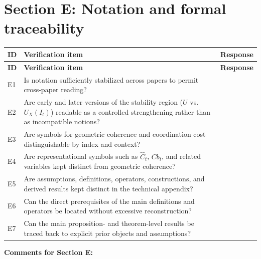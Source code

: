\documentclass[11pt,a4paper]{article}
\begin{document}
	\vspace{3em}
	
	\section{Section E: Notation and formal traceability}
	
	\begin{longtable}{>{\RaggedRight\arraybackslash}p{}
			>{\RaggedRight\arraybackslash}p{}
			>{\RaggedRight\arraybackslash}p{}}
		\toprule
		\textbf{ID} & \textbf{Verification item} & \textbf{Response} \\
		\midrule
		\endfirsthead
		\toprule
		\textbf{ID} & \textbf{Verification item} & \textbf{Response} \\
		\midrule
		\endhead
		
		E1 & Is notation sufficiently stabilized across papers to permit cross-paper reading? & \\
		
		E2 & Are early and later versions of the stability region ($U$ vs.\ $U_X(I_t)$) readable as a controlled strengthening rather than as incompatible notions? & \\
		
		E3 & Are symbols for geometric coherence and coordination cost distinguishable by index and context? & \\
		
		E4 & Are representational symbols such as $\widehat{C}_t$, $Cb_t$, and related variables kept distinct from geometric coherence? & \\
		
		E5 & Are assumptions, definitions, operators, constructions, and derived results kept distinct in the technical appendix? & \\
		
		E6 & Can the direct prerequisites of the main definitions and operators be located without excessive reconstruction? & \\
		
		E7 & Can the main proposition- and theorem-level results be traced back to explicit prior objects and assumptions? & \\
		
		\bottomrule
	\end{longtable}
	
	\textbf{Comments for Section E:}
	
	\vspace{3em}
	
\end{document}
